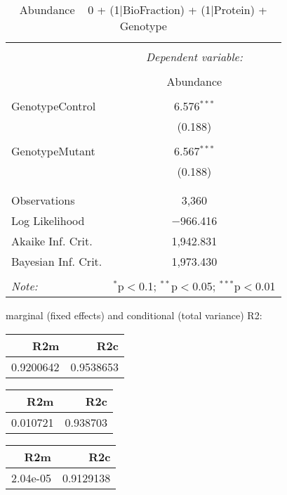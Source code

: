 \documentclass[11pt]{report}
\begin{document}
\begin{table}[!htbp] \centering 
  \caption{Abundance ~ 0 + (1|BioFraction) + (1|Protein) + Genotype} 
  \label{} 
\begin{tabular}{@{\extracolsep{5pt}}lc} 
\\[-1.8ex]\hline 
\hline \\[-1.8ex] 
 & \multicolumn{1}{c}{\textit{Dependent variable:}} \\ 
\cline{2-2} 
\\[-1.8ex] & Abundance \\ 
\hline \\[-1.8ex] 
 GenotypeControl & 6.576$^{***}$ \\ 
  & (0.188) \\ 
  & \\ 
 GenotypeMutant & 6.567$^{***}$ \\ 
  & (0.188) \\ 
  & \\ 
\hline \\[-1.8ex] 
Observations & 3,360 \\ 
Log Likelihood & $-$966.416 \\ 
Akaike Inf. Crit. & 1,942.831 \\ 
Bayesian Inf. Crit. & 1,973.430 \\ 
\hline 
\hline \\[-1.8ex] 
\textit{Note:}  & \multicolumn{1}{r}{$^{*}$p$<$0.1; $^{**}$p$<$0.05; $^{***}$p$<$0.01} \\ 
\end{tabular} 
\end{table} 
marginal (fixed effects) and conditional (total variance) R2:

\begin{tabular}{r|r}
\hline
R2m & R2c\\
\hline
0.9200642 & 0.9538653\\
\hline
\end{tabular}

\begin{tabular}{r|r}
\hline
R2m & R2c\\
\hline
0.010721 & 0.938703\\
\hline
\end{tabular}

\begin{tabular}{r|r}
\hline
R2m & R2c\\
\hline
2.04e-05 & 0.9129138\\
\hline
\end{tabular}
\end{document}
